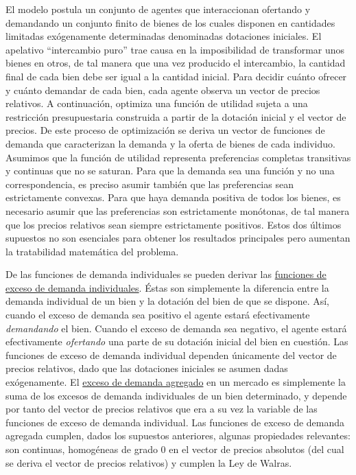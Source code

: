 \documentclass{nuevotema}
\begin{document}
El modelo postula un conjunto de agentes que interaccionan ofertando y demandando un conjunto finito de bienes de los cuales disponen en cantidades limitadas exógenamente determinadas denominadas dotaciones iniciales. El apelativo ``intercambio puro'' trae causa en la imposibilidad de transformar unos bienes en otros, de tal manera que una vez producido el intercambio, la cantidad final de cada bien debe ser igual a la cantidad inicial. Para decidir cuánto ofrecer y cuánto demandar de cada bien, cada agente observa un vector de precios relativos. A continuación, optimiza una función de utilidad sujeta a una restricción presupuestaria construida a partir de la dotación inicial y el vector de precios. De este proceso de optimización se deriva un vector de funciones de demanda que caracterizan la demanda y la oferta de bienes de cada individuo. Asumimos que la función de utilidad representa preferencias completas transitivas y continuas que no se saturan. Para que la demanda sea una función y no una correspondencia, es preciso asumir también que las preferencias sean estrictamente convexas. Para que haya demanda positiva de todos los bienes, es necesario asumir que las preferencias son estrictamente monótonas, de tal manera que los precios relativos sean siempre estrictamente positivos. Estos dos últimos supuestos no son esenciales para obtener los resultados principales pero aumentan la tratabilidad matemática del problema. 

De las funciones de demanda individuales se pueden derivar las \underline{funciones de exceso de demanda individuales}. Éstas son simplemente la diferencia entre la demanda individual de un bien y la dotación del bien de que se dispone. Así, cuando el exceso de demanda sea positivo el agente estará efectivamente \textit{demandando} el bien. Cuando el exceso de demanda sea negativo, el agente estará efectivamente \textit{ofertando} una parte de su dotación inicial del bien en cuestión. Las funciones de exceso de demanda individual dependen únicamente del vector de precios relativos, dado que las dotaciones iniciales se asumen dadas exógenamente. El \underline{exceso de demanda agregado} en un mercado es simplemente la suma de los excesos de demanda individuales de un bien determinado, y depende por tanto del vector de precios relativos que era a su vez la variable de las funciones de exceso de demanda individual. Las funciones de exceso de demanda agregada cumplen, dados los supuestos anteriores, algunas propiedades relevantes: son continuas, homogéneas de grado 0 en el vector de precios absolutos (del cual se deriva el vector de precios relativos) y cumplen la Ley de Walras.
\end{document}
